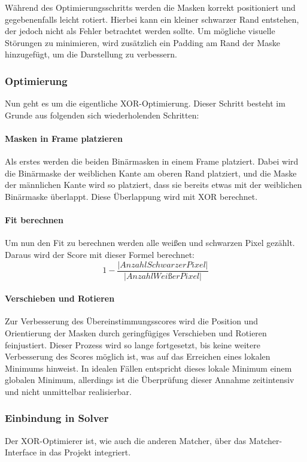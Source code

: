 Während des Optimierungsschritts werden die Masken korrekt positioniert und gegebenenfalls leicht rotiert. Hierbei kann ein kleiner schwarzer Rand entstehen, der jedoch nicht als Fehler betrachtet werden sollte. Um mögliche visuelle Störungen zu minimieren, wird zusätzlich ein Padding am Rand der Maske hinzugefügt, um die Darstellung zu verbessern.

\subsubsection*{Optimierung}

Nun geht es um die eigentliche XOR-Optimierung. Dieser Schritt besteht im Grunde aus folgenden sich wiederholenden Schritten:

\paragraph{Masken in Frame platzieren}
Als erstes werden die beiden Binärmasken in einem Frame platziert. Dabei wird die Binärmaske der weiblichen Kante am oberen Rand platziert, und die Maske der männlichen Kante wird so platziert, dass sie bereits etwas mit der weiblichen Binärmaske überlappt. Diese Überlappung wird mit XOR berechnet.

\paragraph{Fit berechnen}
Um nun den Fit zu berechnen werden alle weißen und schwarzen Pixel gezählt. Daraus wird der Score mit dieser Formel berechnet:
\[
1 -  \frac{\left|AnzahlSchwarzerPixel\right|}{\left|AnzahlWeißerPixel\right|}
\]

\paragraph{Verschieben und Rotieren}
Zur Verbesserung des Übereinstimmungsscores wird die Position und Orientierung der Masken durch geringfügiges Verschieben und Rotieren feinjustiert. Dieser Prozess wird so lange fortgesetzt, bis keine weitere Verbesserung des Scores möglich ist, was auf das Erreichen eines lokalen Minimums hinweist. In idealen Fällen entspricht dieses lokale Minimum einem globalen Minimum, allerdings ist die Überprüfung dieser Annahme zeitintensiv und nicht unmittelbar realisierbar.

\subsubsection*{Einbindung in Solver}
Der XOR-Optimierer ist, wie auch die anderen Matcher, über das Matcher-Interface in das Projekt integriert. 

